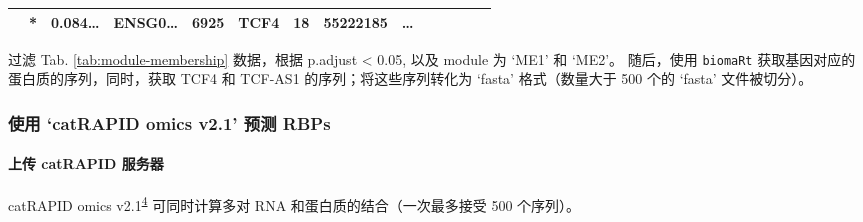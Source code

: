 \documentclass[
]{article}
\begin{document}
\begin{longtable}[]{@{}llllllllllllll@{}}
\begin{minipage}[t]{0.05\columnwidth}
\end{minipage} & \begin{minipage}[t]{0.03\columnwidth}\raggedright
*\strut
\end{minipage} & \begin{minipage}[t]{0.05\columnwidth}\raggedright
0.084\ldots{}\strut
\end{minipage} & \begin{minipage}[t]{0.05\columnwidth}\raggedright
ENSG0\ldots{}\strut
\end{minipage} & \begin{minipage}[t]{0.05\columnwidth}\raggedright
6925\strut
\end{minipage} & \begin{minipage}[t]{0.05\columnwidth}\raggedright
TCF4\strut
\end{minipage} & \begin{minipage}[t]{0.05\columnwidth}\raggedright
18\strut
\end{minipage} & \begin{minipage}[t]{0.05\columnwidth}\raggedright
55222185\strut
\end{minipage} & \begin{minipage}[t]{0.02\columnwidth}\raggedright
\ldots{}\strut
\end{minipage}\tabularnewline
\bottomrule
\end{longtable}

过滤 Tab. \ref{tab:module-membership} 数据，根据 p.adjust \textless{} 0.05, 以及 module 为 `ME1' 和 `ME2'。
随后，使用 \texttt{biomaRt} 获取基因对应的蛋白质的序列，同时，获取 TCF4 和 TCF-AS1 的序列；将这些序列转化为 `fasta'
格式（数量大于 500 个的 `fasta' 文件被切分）。

\hypertarget{ux4f7fux7528-catrapid-omics-v2.1-ux9884ux6d4b-rbps}{%
\subsubsection{使用 `catRAPID omics v2.1' 预测 RBPs}\label{ux4f7fux7528-catrapid-omics-v2.1-ux9884ux6d4b-rbps}}

\hypertarget{ux4e0aux4f20-catrapid-ux670dux52a1ux5668}{%
\paragraph{上传 catRAPID 服务器}\label{ux4e0aux4f20-catrapid-ux670dux52a1ux5668}}

catRAPID omics v2.1\textsuperscript{\protect\hyperlink{ref-ICatIRapidArmaos2021}{4}} 可同时计算多对 RNA 和蛋白质的结合（一次最多接受 500 个序列）。
\end{document}
